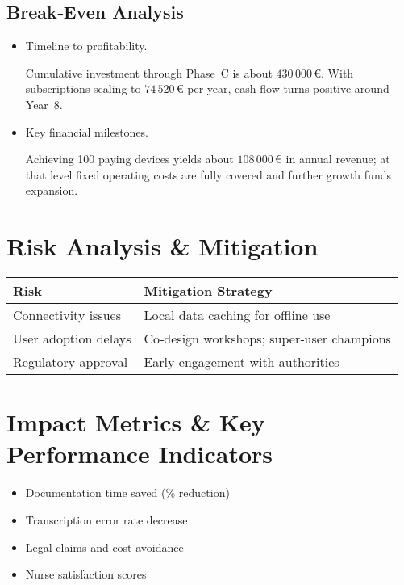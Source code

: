 \documentclass[a4paper,11pt]{article}
\begin{document}
\subsection{Break‐Even Analysis}
\begin{itemize}
  \item Timeline to profitability. 
  
  Cumulative investment through Phase~C is about \(430\,000\,\text{€}\). With subscriptions scaling to \(74\,520\,\text{€}\) per year, cash flow turns positive around Year~8.
  \item Key financial milestones. 
  
  Achieving 100 paying devices yields about \(108\,000\,\text{€}\) in annual revenue; at that level fixed operating costs are fully covered and further growth funds expansion.
\end{itemize}

\section{Risk Analysis \& Mitigation}
\begin{tabular}{p{} p{}}
\textbf{Risk} & \textbf{Mitigation Strategy} \\ \hline
Connectivity issues & Local data caching for offline use \\
User adoption delays & Co‐design workshops; super‐user champions \\
Regulatory approval & Early engagement with authorities \\
\end{tabular}

\section{Impact Metrics \& Key Performance Indicators}
\begin{itemize}
  \item Documentation time saved (\% reduction)
  \item Transcription error rate decrease
  \item Legal claims and cost avoidance
  \item Nurse satisfaction scores
\end{itemize}
\end{document}
